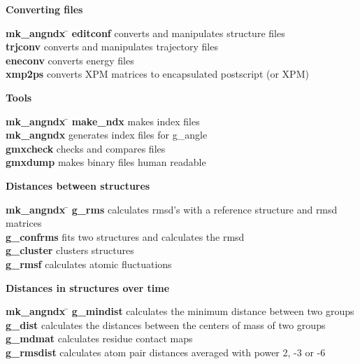 \begin{description}
\item {\large\bf Converting files}
\begin{tabbing}
{\bf mk\_angndx} \= \kill
{\bf editconf} \> converts and manipulates structure files \\
{\bf trjconv} \> converts and manipulates trajectory files \\
{\bf eneconv} \> converts energy files \\
{\bf xmp2ps} \> converts XPM matrices to encapsulated postscript (or XPM) \\
\end{tabbing}

\item {\large\bf Tools}
\begin{tabbing}
{\bf mk\_angndx} \= \kill
{\bf make\_ndx} \> makes index files \\
{\bf mk\_angndx} \> generates index files for g\_angle \\
{\bf gmxcheck} \> checks and compares files \\
{\bf gmxdump} \> makes binary files human readable \\
\end{tabbing}

\item {\large\bf Distances between structures}
\begin{tabbing}
{\bf mk\_angndx} \= \kill
{\bf g\_rms} \> calculates rmsd's with a reference structure and rmsd matrices \\
{\bf g\_confrms} \> fits two structures and calculates the rmsd  \\
{\bf g\_cluster} \> clusters structures \\
{\bf g\_rmsf} \> calculates atomic fluctuations \\
\end{tabbing}

\item {\large\bf Distances in structures over time}
\begin{tabbing}
{\bf mk\_angndx} \= \kill
{\bf g\_mindist} \> calculates the minimum distance between two groups \\
{\bf g\_dist} \> calculates the distances between the centers of mass of two groups \\
{\bf g\_mdmat} \> calculates residue contact maps \\
{\bf g\_rmsdist} \> calculates atom pair distances averaged with power 2, -3 or -6 \\
\end{tabbing}


\end{description}
